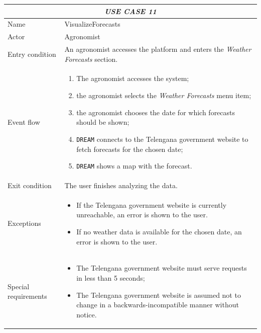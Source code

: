 \documentclass{article}
\begin{document}

\centering
\begin{longtable}{|p{3.5cm}|m{8cm}|}
 \hline
 \multicolumn{2}{|c|}{\cellcolor{white}\emph{USE CASE 11}} \\
 \endfirsthead
 \endhead
 \endfoot
 \endlastfoot
 \hline
 Name & VisualizeForecasts\\
 \hline
 Actor & Agronomist\\
 \hline
 Entry condition & An agronomist accesses the platform and enters the \emph{Weather Forecasts} section.\\
 \hline
 Event flow & \begin{enumerate}
    \item The agronomist accesses the system;
    \item the agronomist selects the \emph{Weather Forecasts} menu item;
    \item the agronomist chooses the date for which forecasts should be shown;
    \item \verb|DREAM| connects to the Telengana government website to fetch forecasts for the chosen date;
    \item \verb|DREAM| shows a map with the forecast.
 \end{enumerate}\\
 \hline
 Exit condition & The user finishes analyzing the data.\\
 \hline
 Exceptions & \begin{itemize}
     \item If the Telengana government website is currently unreachable, an error is shown to the user.
     \item If no weather data is available for the chosen date, an error is shown to the user.
 \end{itemize}\\
 \hline
 Special requirements &\begin{itemize}
     \item The Telengana government website must serve requests in less than 5 seconds;
     \item The Telengana government website is assumed not to change in a backwards-incompatible manner without notice.
 \end{itemize}\\
 \hline
\end{longtable}
\end{document}
